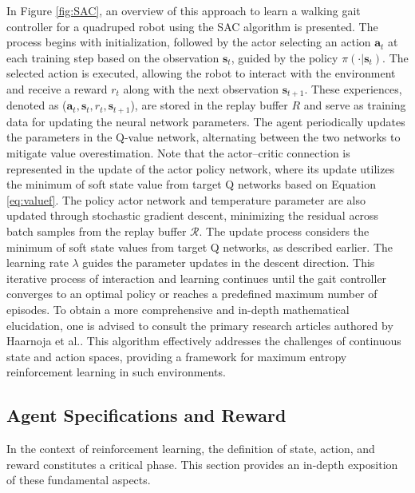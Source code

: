 In Figure \ref{fig:SAC}, an overview of this approach to learn a walking gait controller for a quadruped robot using the SAC algorithm is presented. The process begins with initialization, followed by the actor selecting an action $\mathbf{a}_t$ at each training step based on the observation $\mathbf{s}_t$, guided by the policy $\pi(\cdot|\mathbf{s}_t)$. The selected action is executed, allowing the robot to interact with the environment and receive a reward $r_t$ along with the next observation $\mathbf{s}_{t+1}$. These experiences, denoted as ($\mathbf{a}_t, \mathbf{s}_t, r_t, \mathbf{s}_{t+1}$), are stored in the replay buffer $R$ and serve as training data for updating the neural network parameters. The agent periodically updates the parameters in the Q-value network, alternating between the two networks to mitigate value overestimation. Note that the actor–critic connection is represented in the update of the actor policy network, where its update utilizes the minimum of soft state value from target Q networks based on Equation \ref{eq:valuef}. The policy actor network and temperature parameter are also updated through stochastic gradient descent, minimizing the residual across batch samples from the replay buffer $\mathcal{R}$. The update process considers the minimum of soft state values from target Q networks, as described earlier. The learning rate $\lambda$ guides the parameter updates in the descent direction. This iterative process of interaction and learning continues until the gait controller converges to an optimal policy or reaches a predefined maximum number of episodes. To obtain a more comprehensive and in-depth mathematical elucidation, one is advised to consult the primary research articles authored by Haarnoja et al.\cite{haarnojaSoftActorCriticAlgorithms2019, haarnojaSoftActorCriticOffPolicy2018}. This algorithm effectively addresses the challenges of continuous state and action spaces, providing a framework for maximum entropy reinforcement learning in such environments.

\subsection{Agent Specifications and Reward}
In the context of reinforcement learning, the definition of state, action, and reward constitutes a critical phase. This section provides an in-depth exposition of these fundamental aspects.

